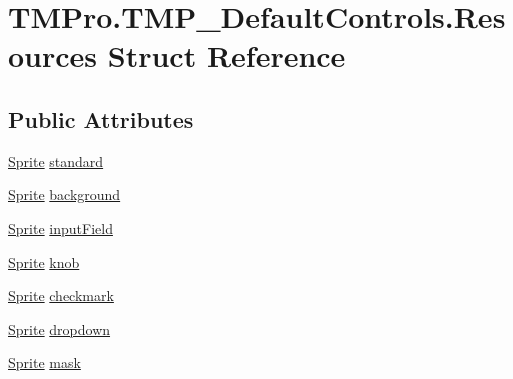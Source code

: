 \hypertarget{struct_t_m_pro_1_1_t_m_p___default_controls_1_1_resources}{}\section{T\+M\+Pro.\+T\+M\+P\+\_\+\+Default\+Controls.\+Resources Struct Reference}
\label{struct_t_m_pro_1_1_t_m_p___default_controls_1_1_resources}
\subsection*{Public Attributes}
\begin{DoxyCompactItemize}
\item 
\mbox{\hyperlink{namespace_t_m_pro_ab5662f47179bf1b81c575ecf80b24065a51f2b7b14433aa22c67d1f4fc18943cd}{Sprite}} \mbox{\hyperlink{struct_t_m_pro_1_1_t_m_p___default_controls_1_1_resources_aef20379f590b4d805b658c5d0a47e88d}{standard}}
\item 
\mbox{\hyperlink{namespace_t_m_pro_ab5662f47179bf1b81c575ecf80b24065a51f2b7b14433aa22c67d1f4fc18943cd}{Sprite}} \mbox{\hyperlink{struct_t_m_pro_1_1_t_m_p___default_controls_1_1_resources_a05bed50721aec60ad69599a39779aca5}{background}}
\item 
\mbox{\hyperlink{namespace_t_m_pro_ab5662f47179bf1b81c575ecf80b24065a51f2b7b14433aa22c67d1f4fc18943cd}{Sprite}} \mbox{\hyperlink{struct_t_m_pro_1_1_t_m_p___default_controls_1_1_resources_a2161db724e3fd4dc488e91fb4f44f099}{input\+Field}}
\item 
\mbox{\hyperlink{namespace_t_m_pro_ab5662f47179bf1b81c575ecf80b24065a51f2b7b14433aa22c67d1f4fc18943cd}{Sprite}} \mbox{\hyperlink{struct_t_m_pro_1_1_t_m_p___default_controls_1_1_resources_a6d7b17af4613548afb3d238b49a0982b}{knob}}
\item 
\mbox{\hyperlink{namespace_t_m_pro_ab5662f47179bf1b81c575ecf80b24065a51f2b7b14433aa22c67d1f4fc18943cd}{Sprite}} \mbox{\hyperlink{struct_t_m_pro_1_1_t_m_p___default_controls_1_1_resources_aded76c75ca1e7cbc0c2d990c52b1b3a2}{checkmark}}
\item 
\mbox{\hyperlink{namespace_t_m_pro_ab5662f47179bf1b81c575ecf80b24065a51f2b7b14433aa22c67d1f4fc18943cd}{Sprite}} \mbox{\hyperlink{struct_t_m_pro_1_1_t_m_p___default_controls_1_1_resources_a2c06e5a4153fe97251db9adc96aedf14}{dropdown}}
\item 
\mbox{\hyperlink{namespace_t_m_pro_ab5662f47179bf1b81c575ecf80b24065a51f2b7b14433aa22c67d1f4fc18943cd}{Sprite}} \mbox{\hyperlink{struct_t_m_pro_1_1_t_m_p___default_controls_1_1_resources_ab169512950fe9ffcca5df349be390f06}{mask}}
\end{DoxyCompactItemize}


